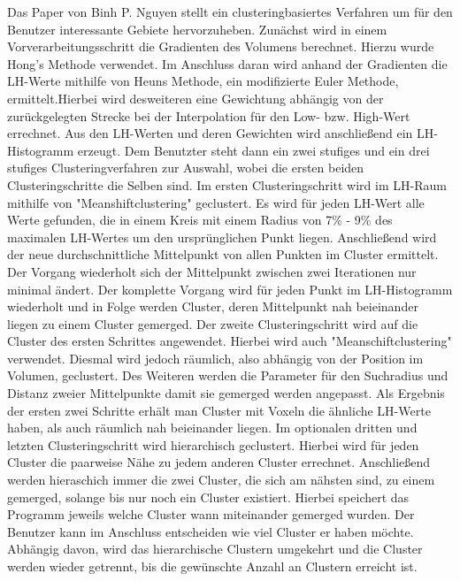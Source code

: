 Das Paper von Binh P. Nguyen \cite{nguyen2012clustering} stellt ein clusteringbasiertes Verfahren um für den Benutzer interessante Gebiete hervorzuheben.
\newline
Zunächst wird in einem Vorverarbeitungsschritt die Gradienten des Volumens berechnet. Hierzu wurde Hong's Methode \cite{hong2003method} verwendet. Im Anschluss daran wird anhand der Gradienten die LH-Werte mithilfe von Heuns Methode, ein modifizierte Euler Methode, ermittelt.Hierbei wird desweiteren eine Gewichtung abhängig von der zurückgelegten Strecke bei der Interpolation für den Low- bzw. High-Wert errechnet. Aus den LH-Werten und deren Gewichten wird anschließend ein LH-Histogramm erzeugt.
\newline
Dem Benutzter steht dann ein zwei stufiges und ein drei stufiges Clusteringverfahren zur Auswahl, wobei die ersten beiden Clusteringschritte die Selben sind. 
Im ersten Clusteringschritt wird im LH-Raum mithilfe von "Meanshiftclustering" geclustert. Es wird für jeden LH-Wert alle Werte gefunden, die in einem Kreis mit einem Radius von 7\% - 9\%  des maximalen LH-Wertes um den ursprünglichen Punkt liegen. Anschließend wird der neue durchschnittliche Mittelpunkt von allen Punkten im Cluster ermittelt. Der Vorgang wiederholt sich der Mittelpunkt zwischen zwei Iterationen nur minimal ändert. Der komplette Vorgang wird für jeden Punkt im LH-Histogramm wiederholt und in Folge werden Cluster, deren Mittelpunkt nah beieinander liegen zu einem Cluster gemerged.
\newline
Der zweite Clusteringschritt wird auf die Cluster des ersten Schrittes angewendet. Hierbei wird auch "Meanschiftclustering" verwendet. Diesmal wird jedoch räumlich, also abhängig von der Position im Volumen, geclustert. Des Weiteren werden die Parameter für den Suchradius und Distanz zweier Mittelpunkte damit sie gemerged werden angepasst.
\newline
Als Ergebnis der ersten zwei Schritte erhält man Cluster mit Voxeln die ähnliche LH-Werte haben, als auch räumlich nah beieinander liegen.
\newline
Im optionalen dritten und letzten Clusteringschritt wird hierarchisch geclustert. Hierbei wird für jeden Cluster die paarweise Nähe zu jedem anderen Cluster errechnet. Anschließend werden hieraschich immer die zwei Cluster, die sich am nähsten sind, zu einem gemerged, solange bis nur noch ein Cluster existiert.  Hierbei speichert das Programm jeweils welche Cluster wann miteinander gemerged wurden. Der Benutzer kann im Anschluss entscheiden wie viel Cluster er haben möchte. Abhängig davon, wird das hierarchische Clustern umgekehrt und die Cluster werden wieder getrennt, bis die gewünschte Anzahl an Clustern erreicht ist.
